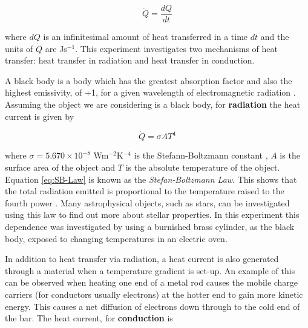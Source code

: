 \documentclass{article}
\begin{document}
\begin{equation}
\label{eq:Heat-Current}
\dot{Q} = \frac{dQ}{dt}
\end{equation}

\vspace{2mm}
\noindent
where $dQ$ is an infinitesimal amount of heat transferred in a time $dt$ and the units of $\dot{Q}$ are Js$^{-1}$. This experiment investigates two mechanisms of heat transfer: heat transfer in radiation and heat transfer in conduction.

\vspace{2mm}
\noindent
A black body is a body which has the greatest absorption factor and also the highest emissivity, of +1, for a given wavelength of electromagnetic radiation \cite{Paper01}. %
Assuming the object we are considering is a black body, for \textbf{radiation} the heat current is given by

\begin{equation}
\label{eq:SB-Law}
\dot{Q} = \sigma AT^4
\end{equation}

\vspace{2mm}
\noindent
where $\sigma = 5.670 \times 10^{-8}$ Wm$^{-2}$K$^{-4}$ is the Stefann-Boltzmann constant \cite{Book01}, $A$ is the surface area of the object and $T$ is the absolute temperature of the object. Equation \eqref{eq:SB-Law} is known as the \textit{Stefan-Boltzmann Law}. This shows that the total radiation emitted is proportional to the temperature raised to the fourth power \cite{Paper01}. Many astrophysical objects, such as stars, can be investigated using this law to find out more about stellar properties.
In this experiment this dependence was investigated by using a burnished brass cylinder, as the black body, exposed to changing temperatures in an electric oven.

\vspace{2mm}
\noindent
In addition to heat transfer via radiation, a heat current is also generated through a material when a temperature gradient is set-up. An example of this can be observed when heating one end of a metal rod causes the mobile charge carriers (for conductors usually electrons) \cite{Paper01} at the hotter end to gain more kinetic energy. This causes a net diffusion of electrons down through to the cold end of the bar. The heat current, for \textbf{conduction} is 
\end{document}
